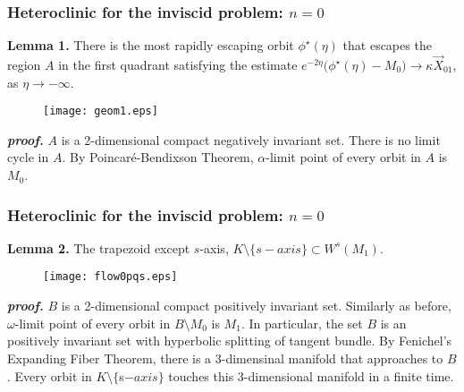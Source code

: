 \documentclass{beamer}
\def\blue{\color{blue}}
\begin{document}
\begin{frame}
 \frametitle{Heteroclinic for the inviscid problem: $n=0$}
 {\bf Lemma 1.} There is the most rapidly escaping orbit $\phi^\star(\eta)$ that escapes the region $A$ in the first quadrant satisfying the estimate
 $e^{-2\eta}\Big(\phi^\star(\eta)- M_0\Big) \rightarrow \kappa\vec{X}_{01}$, as $\eta \rightarrow -\infty$.
 \begin{figure}
  \centering
    \texttt{[image: geom1.eps]}
 \end{figure}
 {\bf \it proof.}
 {\scriptsize
  $A$ is a 2-dimensional compact negatively invariant set. There is no limit cycle in $A$. By Poincar\'e-Bendixson Theorem, $\alpha$-limit point of every orbit in $A$ is $M_0$. 
 }
\end{frame}

\begin{frame}
 \frametitle{Heteroclinic for the inviscid problem: $n=0$}
 {\bf Lemma 2.} The trapezoid except $s$-axis, $K\setminus \{s-axis\}\subset W^s(M_1)$.
  \begin{figure}
  \centering
    \texttt{[image: flow0pqs.eps]}
 \end{figure}
 {\scriptsize
 {\bf \it proof.}
  $B$ is a 2-dimensional compact positively invariant set. Similarly as before, $\omega$-limit point of every orbit in $B\setminus M_0$ is $M_1$. In particular, the set $B$ is an {\blue positively invariant set with hyperbolic splitting} of tangent bundle. By Fenichel's Expanding Fiber Theorem, there is a 3-dimensinal manifold that approaches to $B$. Every orbit in $K\setminus \{$s$-axis\}$ touches this $3$-dimensional manifold in a finite time.
 }
\end{frame}
\end{document}

